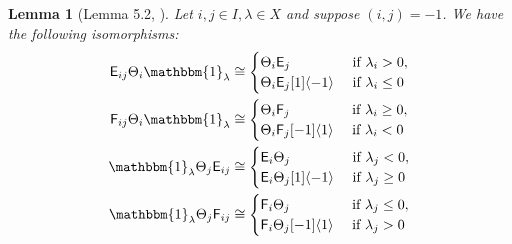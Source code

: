 \documentclass[11pt,reqno]{amsart}
\numberwithin{equation}{section}
\newtheorem{Proposition}[equation]{Proposition}
\newtheorem{Lemma}[equation]{Lemma}
\theoremstyle{definition}
\theoremstyle{named}
\newcommand{\cC}{\mathcal{C}}
\newcommand{\sE}{\mathsf{E}}
\newcommand{\sF}{\mathsf{F}}
\newcommand{\fg}{\mathfrak{g}}
\newcommand{\oded}[1]{\textcolor{red}{$[\star$ Oded: #1 $\star]$}}
\newcommand{\bone}{\mathbbm{1}}
\begin{document}
\begin{Lemma}[Lemma 5.2, \cite{Cauclasp}]\label{lem:Cau} Let $i,j\in I,  \lambda \in X$ and suppose $(i,j)=-1$.  We have the following isomorphisms:
\begin{align*}
\sE_{ij} \Theta_i \bone_\lambda &\cong \begin{cases} \Theta_i\sE_j &\text{ if } \lambda_i>0, \\
\Theta_i\sE_j[1]\langle -1 \rangle &\text{ if } \lambda_i\leq 0 \end{cases} \\
\sF_{ij} \Theta_i \bone_\lambda &\cong \begin{cases} \Theta_i\sF_j &\text{ if } \lambda_i\geq0, \\
\Theta_i\sF_j[-1]\langle 1 \rangle &\text{ if } \lambda_i< 0 \end{cases} \\
\bone_\lambda\Theta_j\sE_{ij} &\cong \begin{cases} \sE_i\Theta_j &\text{ if } \lambda_j<0, \\
\sE_i\Theta_j[1]\langle -1 \rangle &\text{ if } \lambda_j\geq 0 \end{cases} \\
\bone_\lambda\Theta_j\sF_{ij} &\cong \begin{cases} \sF_i\Theta_j &\text{ if } \lambda_j\leq0, \\
\sF_i\Theta_j[-1]\langle 1 \rangle &\text{ if } \lambda_j> 0 \end{cases} 
\end{align*}

\end{Lemma}






%
%
\end{document}
